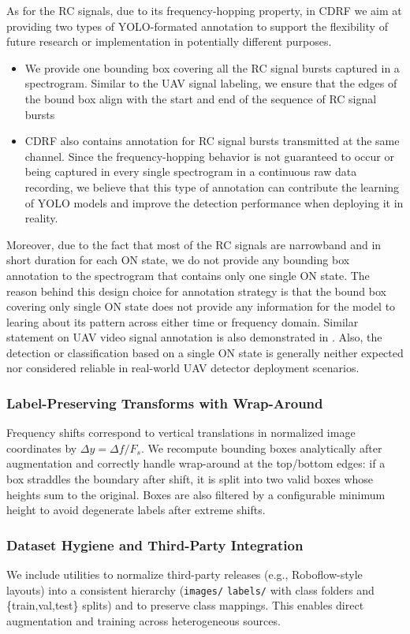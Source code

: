 As for the RC signals, due to its frequency-hopping property, in CDRF we aim at providing two types of YOLO-formated annotation to support the flexibility of future research or implementation in potentially different purposes. 
\begin{itemize}
    \item We provide one bounding box covering all the RC signal bursts captured in a spectrogram. Similar to the UAV signal labeling, we ensure that the edges of the bound box align with the start and end of the sequence of RC signal bursts
    \item CDRF also contains annotation for RC signal bursts transmitted at the same channel. Since the frequency-hopping behavior is not guaranteed to occur or being captured in every single spectrogram in a continuous raw data recording, we believe that this type of annotation can contribute the learning of YOLO models and improve the detection performance when deploying it in reality. 
\end{itemize}

Moreover, due to the fact that most of the RC signals are narrowband and in short duration for each ON state, we do not provide any bounding box annotation to the spectrogram that contains only one single ON state. The reason behind this design choice for annotation strategy is that the bound box covering only single ON state does not provide any information for the model to learing about its pattern across either time or frequency domain. Similar statement on UAV video signal annotation is also demonstrated in \cite{nelega2023radio}. Also, the detection or classification based on a single ON state is generally neither expected nor considered reliable in real-world UAV detector deployment scenarios.

\subsubsection{Label-Preserving Transforms with Wrap-Around}
Frequency shifts correspond to vertical translations in normalized image coordinates by $\Delta y=\Delta f/F_s$. We recompute bounding boxes analytically after augmentation and correctly handle wrap-around at the top/bottom edges: if a box straddles the boundary after shift, it is split into two valid boxes whose heights sum to the original. Boxes are also filtered by a configurable minimum height to avoid degenerate labels after extreme shifts.

\subsubsection{Dataset Hygiene and Third-Party Integration}
We include utilities to normalize third-party releases (e.g., Roboflow-style layouts) into a consistent hierarchy (\texttt{images/}\,\,\texttt{labels/} with class folders and \{train,val,test\} splits) and to preserve class mappings. This enables direct augmentation and training across heterogeneous sources.


